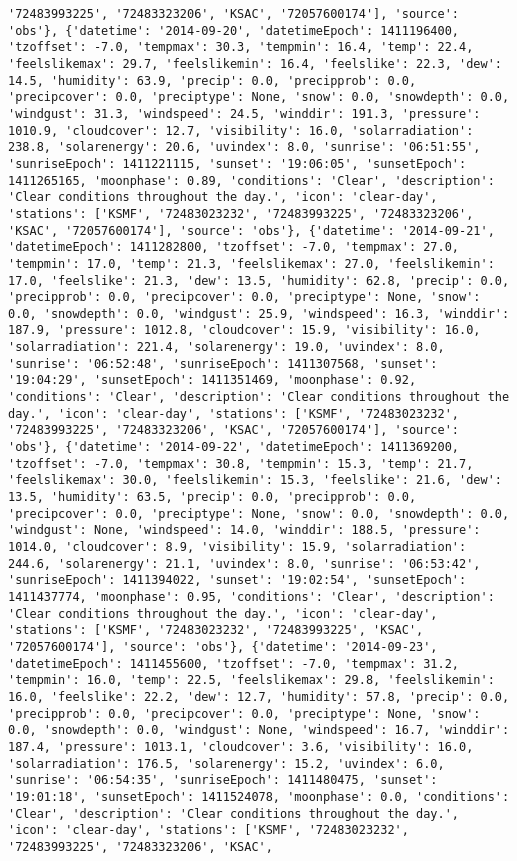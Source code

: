 \documentclass[
  letterpaper,
  DIV=11,
  numbers=noendperiod]{scrartcl}
\begin{document}
\begin{verbatim}
'72483993225', '72483323206', 'KSAC', '72057600174'], 'source': 'obs'}, {'datetime': '2014-09-20', 'datetimeEpoch': 1411196400, 'tzoffset': -7.0, 'tempmax': 30.3, 'tempmin': 16.4, 'temp': 22.4, 'feelslikemax': 29.7, 'feelslikemin': 16.4, 'feelslike': 22.3, 'dew': 14.5, 'humidity': 63.9, 'precip': 0.0, 'precipprob': 0.0, 'precipcover': 0.0, 'preciptype': None, 'snow': 0.0, 'snowdepth': 0.0, 'windgust': 31.3, 'windspeed': 24.5, 'winddir': 191.3, 'pressure': 1010.9, 'cloudcover': 12.7, 'visibility': 16.0, 'solarradiation': 238.8, 'solarenergy': 20.6, 'uvindex': 8.0, 'sunrise': '06:51:55', 'sunriseEpoch': 1411221115, 'sunset': '19:06:05', 'sunsetEpoch': 1411265165, 'moonphase': 0.89, 'conditions': 'Clear', 'description': 'Clear conditions throughout the day.', 'icon': 'clear-day', 'stations': ['KSMF', '72483023232', '72483993225', '72483323206', 'KSAC', '72057600174'], 'source': 'obs'}, {'datetime': '2014-09-21', 'datetimeEpoch': 1411282800, 'tzoffset': -7.0, 'tempmax': 27.0, 'tempmin': 17.0, 'temp': 21.3, 'feelslikemax': 27.0, 'feelslikemin': 17.0, 'feelslike': 21.3, 'dew': 13.5, 'humidity': 62.8, 'precip': 0.0, 'precipprob': 0.0, 'precipcover': 0.0, 'preciptype': None, 'snow': 0.0, 'snowdepth': 0.0, 'windgust': 25.9, 'windspeed': 16.3, 'winddir': 187.9, 'pressure': 1012.8, 'cloudcover': 15.9, 'visibility': 16.0, 'solarradiation': 221.4, 'solarenergy': 19.0, 'uvindex': 8.0, 'sunrise': '06:52:48', 'sunriseEpoch': 1411307568, 'sunset': '19:04:29', 'sunsetEpoch': 1411351469, 'moonphase': 0.92, 'conditions': 'Clear', 'description': 'Clear conditions throughout the day.', 'icon': 'clear-day', 'stations': ['KSMF', '72483023232', '72483993225', '72483323206', 'KSAC', '72057600174'], 'source': 'obs'}, {'datetime': '2014-09-22', 'datetimeEpoch': 1411369200, 'tzoffset': -7.0, 'tempmax': 30.8, 'tempmin': 15.3, 'temp': 21.7, 'feelslikemax': 30.0, 'feelslikemin': 15.3, 'feelslike': 21.6, 'dew': 13.5, 'humidity': 63.5, 'precip': 0.0, 'precipprob': 0.0, 'precipcover': 0.0, 'preciptype': None, 'snow': 0.0, 'snowdepth': 0.0, 'windgust': None, 'windspeed': 14.0, 'winddir': 188.5, 'pressure': 1014.0, 'cloudcover': 8.9, 'visibility': 15.9, 'solarradiation': 244.6, 'solarenergy': 21.1, 'uvindex': 8.0, 'sunrise': '06:53:42', 'sunriseEpoch': 1411394022, 'sunset': '19:02:54', 'sunsetEpoch': 1411437774, 'moonphase': 0.95, 'conditions': 'Clear', 'description': 'Clear conditions throughout the day.', 'icon': 'clear-day', 'stations': ['KSMF', '72483023232', '72483993225', 'KSAC', '72057600174'], 'source': 'obs'}, {'datetime': '2014-09-23', 'datetimeEpoch': 1411455600, 'tzoffset': -7.0, 'tempmax': 31.2, 'tempmin': 16.0, 'temp': 22.5, 'feelslikemax': 29.8, 'feelslikemin': 16.0, 'feelslike': 22.2, 'dew': 12.7, 'humidity': 57.8, 'precip': 0.0, 'precipprob': 0.0, 'precipcover': 0.0, 'preciptype': None, 'snow': 0.0, 'snowdepth': 0.0, 'windgust': None, 'windspeed': 16.7, 'winddir': 187.4, 'pressure': 1013.1, 'cloudcover': 3.6, 'visibility': 16.0, 'solarradiation': 176.5, 'solarenergy': 15.2, 'uvindex': 6.0, 'sunrise': '06:54:35', 'sunriseEpoch': 1411480475, 'sunset': '19:01:18', 'sunsetEpoch': 1411524078, 'moonphase': 0.0, 'conditions': 'Clear', 'description': 'Clear conditions throughout the day.', 'icon': 'clear-day', 'stations': ['KSMF', '72483023232', '72483993225', '72483323206', 'KSAC', 
\end{verbatim}
\end{document}
